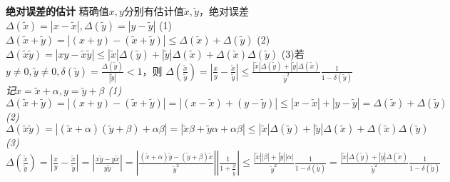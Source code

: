 \documentclass[11pt]{article}
\begin{document}
\textbf{绝对误差的估计}
\newline
精确值$x,y$分别有估计值$\tilde{x},\tilde{y}$，绝对误差$\Delta(\tilde{x})=|x-\tilde{x}|,\Delta(\tilde{y})=|y-\tilde{y}|$
\newline
(1)$\Delta(\tilde{x}+\tilde{y})=|(x+y)-(\tilde{x}+\tilde{y})|\le\Delta(\tilde{x})+\Delta(\tilde{y})$
\newline
(2)$\Delta(\tilde{x}\tilde{y})=|xy-\tilde{x}\tilde{y}|\le |\tilde{x}|\Delta(\tilde{y})+|\tilde{y}|\Delta(\tilde{x})+\Delta(\tilde{x})\Delta(\tilde{y})$
\newline
(3)若$y\not=0,\tilde{y}\not=0,\delta(\tilde{y})=\frac{\Delta(\tilde{y})}{|\tilde{y}|}<1$，则
\newline
$\Delta(\frac{\tilde{x}}{\tilde{y}})=|\frac{x}{y}-\frac{\tilde{x}}{\tilde{y}}|\le \frac{|\tilde{x}|\Delta(\tilde{y})+ |\tilde{y}|\Delta(\tilde{x})}{\tilde{y}^2} \frac{1}{1-\delta(\tilde{y})}$
\newline
\textit{记$x=\tilde{x}+\alpha, y=\tilde{y}+\beta$
\newline
(1)$\Delta(\tilde{x}+\tilde{y})=|(x+y)-(\tilde{x}+\tilde{y})|=|(x-\tilde{x})+(y-\tilde{y})|\le |x-\tilde{x}|+|y-\tilde{y}|=\Delta(\tilde{x})+\Delta(\tilde{y})$
\newline
(2)$\Delta(\tilde{x}\tilde{y})=|(\tilde{x}+\alpha)(\tilde{y}+\beta)+\alpha\beta|=|\tilde{x}\beta+\tilde{y}\alpha+\alpha\beta|\le |\tilde{x}|\Delta(\tilde{y})+|\tilde{y}|\Delta(\tilde{x})+\Delta(\tilde{x})\Delta(\tilde{y})$
\newline
(3)$\Delta(\frac{\tilde{x}}{\tilde{y}})=|\frac{x}{y}-\frac{\tilde{x}}{\tilde{y}}|=|\frac{x\tilde{y}-y\tilde{x}}{y\tilde{y}}|=|\frac{(\tilde{x}+\alpha)\tilde{y}-(\tilde{y}+\beta)\tilde{x}}{\tilde{y}^2}||\frac{1}{1+\frac{\beta}{\tilde{y}}}|\le \frac{|\tilde{x}||\beta|+|\tilde{y}||\alpha|}{\tilde{y}^2} \frac{1}{1-\delta(\tilde{y})}=\frac{|\tilde{x}|\Delta(\tilde{y})+ |\tilde{y}|\Delta(\tilde{x})}{\tilde{y}^2} \frac{1}{1-\delta(\tilde{y})}$
}
\newline
\end{document}
